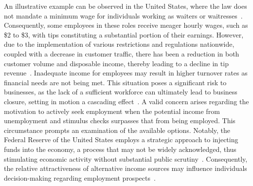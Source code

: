 An illustrative example can be observed in the United States, where the law does not mandate a minimum wage for individuals
working as waiters or waitresses~\cite{dol}. Consequently, some employees in these roles receive meager hourly wages, such
as \$2 to \$3, with tips constituting a substantial portion of their earnings. However, due to the implementation of various
restrictions and regulations nationwide, coupled with a decrease in customer traffic, there has been a reduction in both
customer volume and disposable income, thereby leading to a decline in tip revenue~\cite{bls2022}. Inadequate income for
employees may result in higher turnover rates as financial needs are not being met. This situation poses a significant risk
to businesses, as the lack of a sufficient workforce can ultimately lead to business closure, setting in motion a cascading
effect~\cite{azar2020}. A valid concern arises regarding the motivation to actively seek employment when the potential income
from unemployment and stimulus checks surpasses that from being employed. This circumstance prompts an examination of the
available options. Notably, the Federal Reserve of the United States employs a strategic approach to injecting funds into
the economy, a process that may not be widely acknowledged, thus stimulating economic activity without substantial public
scrutiny~\cite{frb}. Consequently, the relative attractiveness of alternative income sources may influence individuals
decision-making regarding employment prospects~\cite{cbo2021}.

